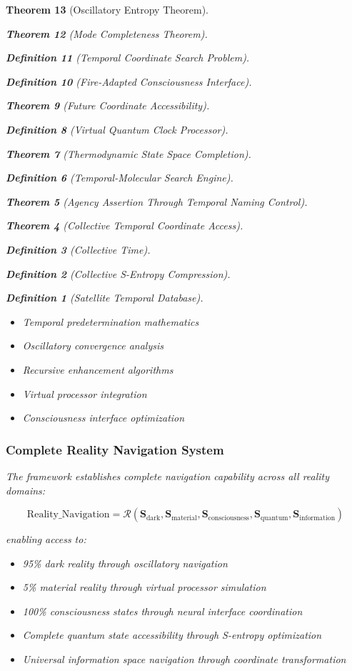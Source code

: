 \documentclass[12pt,a4paper]{article}
\newtheorem{theorem}{Theorem}[section]
\newtheorem{definition}[theorem]{Definition}
\begin{document}
\begin{theorem}[Oscillatory Entropy Theorem]
\begin{theorem}[Mode Completeness Theorem]
\begin{enumerate}
\begin{definition}[Temporal Coordinate Search Problem]
\begin{algorithm}
\begin{definition}[Fire-Adapted Consciousness Interface]
\begin{theorem}[Future Coordinate Accessibility]
\begin{definition}[Virtual Quantum Clock Processor]
\begin{itemize}
\begin{itemize}
\begin{theorem}[Thermodynamic State Space Completion]
\begin{definition}[Temporal-Molecular Search Engine]
\begin{theorem}[Agency Assertion Through Temporal Naming Control]
\begin{remark}
\begin{theorem}[Collective Temporal Coordinate Access]
\begin{definition}[Collective Time]
\begin{definition}[Collective S-Entropy Compression]
\begin{definition}[Satellite Temporal Database]
\begin{algorithm}
\begin{table}[h]
{{\begin{itemize}
\item Temporal predetermination mathematics
\item Oscillatory convergence analysis
\item Recursive enhancement algorithms
\item Virtual processor integration
\item Consciousness interface optimization
\end{itemize}

\subsubsection{Complete Reality Navigation System}

The framework establishes complete navigation capability across all reality domains:

\begin{equation}
\text{Reality\_Navigation} = \mathcal{R}(\mathbf{S}_{\text{dark}}, \mathbf{S}_{\text{material}}, \mathbf{S}_{\text{consciousness}}, \mathbf{S}_{\text{quantum}}, \mathbf{S}_{\text{information}})
\end{equation}

enabling access to:

\begin{itemize}
\item 95\% dark reality through oscillatory navigation
\item 5\% material reality through virtual processor simulation
\item 100\% consciousness states through neural interface coordination
\item Complete quantum state accessibility through S-entropy optimization
\item Universal information space navigation through coordinate transformation
\end{itemize}

}}
\end{table}
\end{algorithm}
\end{definition}
\end{definition}
\end{definition}
\end{theorem}
\end{remark}
\end{theorem}
\end{definition}
\end{theorem}
\end{itemize}
\end{itemize}
\end{definition}
\end{theorem}
\end{definition}
\end{algorithm}
\end{definition}
\end{enumerate}
\end{theorem}
\end{theorem}
\end{document}
